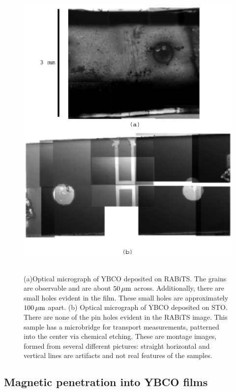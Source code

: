 %
%
\begin{figure}[p]
\includegraphics[height=6.0in]{figs/magpen/fig1.ps}
\caption[Optical micrographs of YBCO deposited on RABiTS and STO.]
{(a)Optical micrograph of YBCO deposited on RABiTS. The grains
are observable and are about $50\,\mu\mathrm{m}$ across. Additionally,
there are small holes evident in the film. These small holes
are approximately $100\,\mu\mathrm{m}$ apart.
(b) Optical micrograph of YBCO deposited on STO. There are none 
of the pin holes evident in the RABiTS image. This sample has a
microbridge for transport measurements, patterned into the center
via chemical etching. These are montage images, formed from several
different pictures: straight horizontal and vertical lines are
artifacts and not real features of the samples. }
\label{fig:optical_rabits}
\end{figure}

\subsection{Magnetic penetration into YBCO films}

